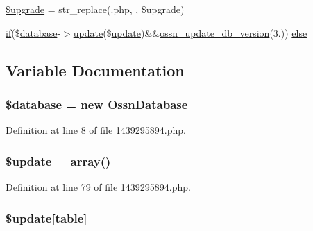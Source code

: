 \begin{DoxyCompactItemize}
\hyperlink{1439295894_8php_a9084097ce600d3cc7a79a20ecaea9906}{\$upgrade} = str\+\_\+replace(\textquotesingle{}.php\textquotesingle{}, \textquotesingle{}\textquotesingle{}, \$upgrade)
\item 
\hyperlink{jquery_8tokeninput_8js_ad8dd46a3cbc004569e34401e9e71771a}{if}(\$\hyperlink{ossn_8config_8db_8example_8php_a4e0ca996705612048240f76ff8d4da95}{database}-\/$>$\hyperlink{_chart_8_doughnut_8js_ad58a8121caa8678969d1ff32848a77c4}{update}(\$\hyperlink{_chart_8_doughnut_8js_ad58a8121caa8678969d1ff32848a77c4}{update})\&\&\hyperlink{ossn_8lib_8upgrade_8php_aa7120e10a9c14b722b0e25c99bc86d92}{ossn\+\_\+update\+\_\+db\+\_\+version}(\textquotesingle{}3.\textquotesingle{})) \hyperlink{1439295894_8php_ae1f047549676f26dbd832af8901676ad}{else}
\end{DoxyCompactItemize}


\subsection{Variable Documentation}
\subsubsection[{\texorpdfstring{\$database}{$database}}]{\setlength{\rightskip}{0pt plus 5cm}\${\bf database} = new {\bf Ossn\+Database}}\hypertarget{1439295894_8php_a7691c0162d89de0b6ba47edcd8ba8878}{}\label{1439295894_8php_a7691c0162d89de0b6ba47edcd8ba8878}


Definition at line 8 of file 1439295894.\+php.

\subsubsection[{\texorpdfstring{\$update}{$update}}]{\setlength{\rightskip}{0pt plus 5cm}\${\bf update} = array()}\hypertarget{1439295894_8php_a13a7db07df65d01cfbca768f443084cc}{}\label{1439295894_8php_a13a7db07df65d01cfbca768f443084cc}


Definition at line 79 of file 1439295894.\+php.

\subsubsection[{\texorpdfstring{\$update}{$update}}]{\setlength{\rightskip}{0pt plus 5cm}\${\bf update}\mbox{[}\textquotesingle{}table\textquotesingle{}\mbox{]} = \textquotesingle{}}\hypertarget{1439295894_8php_aee7ba5985ddf023a93862ab77e9718f9}{}\label{1439295894_8php_aee7ba5985ddf023a93862ab77e9718f9}


